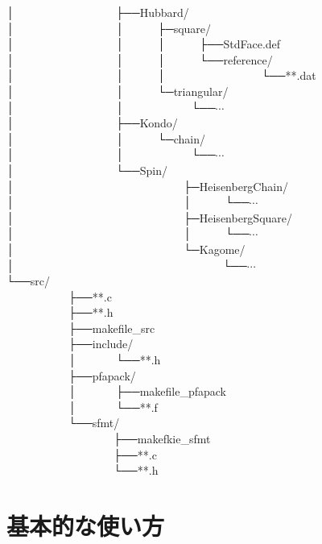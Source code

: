 │~~~~~~~~~~~~~~~~~~├──Hubbard/\\
│~~~~~~~~~~~~~~~~~~│~~~~~~├─square/\\
│~~~~~~~~~~~~~~~~~~│~~~~~~│~~~~~~├──StdFace.def\\
│~~~~~~~~~~~~~~~~~~│~~~~~~│~~~~~~└──reference/\\
│~~~~~~~~~~~~~~~~~~│~~~~~~│~~~~~~~~~~~~~~~~~└──**.dat\\
│~~~~~~~~~~~~~~~~~~│~~~~~~└─triangular/\\
│~~~~~~~~~~~~~~~~~~│~~~~~~~~~~~~└──$\cdots$\\
│~~~~~~~~~~~~~~~~~~├──Kondo/\\
│~~~~~~~~~~~~~~~~~~│~~~~~~└─chain/\\
│~~~~~~~~~~~~~~~~~~│~~~~~~~~~~~~└──$\cdots$\\
│~~~~~~~~~~~~~~~~~~└──Spin/\\
│~~~~~~~~~~~~~~~~~~~~~~~~~~~~~~├─HeisenbergChain/\\
│~~~~~~~~~~~~~~~~~~~~~~~~~~~~~~│~~~~~~└──$\cdots$\\
│~~~~~~~~~~~~~~~~~~~~~~~~~~~~~~├─HeisenbergSquare/\\
│~~~~~~~~~~~~~~~~~~~~~~~~~~~~~~│~~~~~~└──$\cdots$\\
│~~~~~~~~~~~~~~~~~~~~~~~~~~~~~~└─Kagome/\\
│~~~~~~~~~~~~~~~~~~~~~~~~~~~~~~~~~~~~~└──$\cdots$\\
└──src/\\
~~~~~~~~~~~├──**.c\\
~~~~~~~~~~~├──**.h\\
~~~~~~~~~~~├──makefile\_src\\
~~~~~~~~~~~├──include/\\
~~~~~~~~~~~│~~~~~~~└──**.h\\
~~~~~~~~~~~├──pfapack/\\
~~~~~~~~~~~│~~~~~~~├──makefile\_pfapack\\
~~~~~~~~~~~│~~~~~~~└──**.f\\
~~~~~~~~~~~└──sfmt/\\
~~~~~~~~~~~~~~~~~~~├──makefkie\_sfmt\\
~~~~~~~~~~~~~~~~~~~├──**.c\\
~~~~~~~~~~~~~~~~~~~└──**.h\\

\newpage
\section{基本的な使い方}


